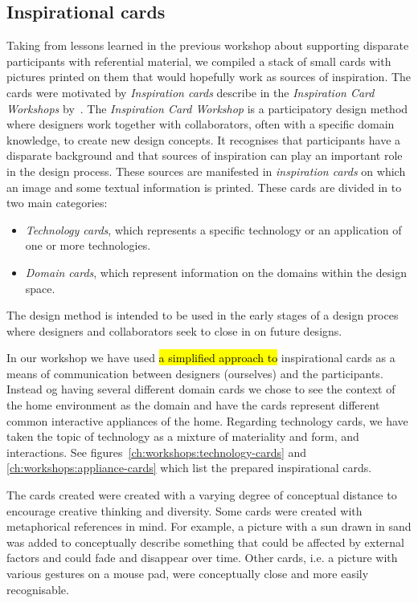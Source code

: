 \subsection{Inspirational cards}

Taking from lessons learned in the previous workshop about supporting disparate participants with referential material, we compiled a stack of small cards with pictures printed on them that would hopefully work as sources of inspiration.
The cards were motivated by \emph{Inspiration cards} describe in the \emph{Inspiration Card Workshops} by~\cite{halskov2006inspiration}.
The \emph{Inspiration Card Workshop} is a participatory design method where designers work together with collaborators, often with a specific domain knowledge, to create new design concepts.
It recognises that participants have a disparate background and that sources of inspiration can play an important role in the design process.
These sources are manifested in \emph{inspiration cards} on which an image and some textual information is printed.
These cards are divided in to two main categories:
\begin{itemize}
  \item{\emph{Technology cards}, which represents a specific technology or an application of one or more technologies.}
  \item{\emph{Domain cards}, which represent information on the domains within the design space.}
\end{itemize}
The design method is intended to be used in the early stages of a design proces where designers and collaborators seek to close in on future designs.

In our workshop we have used \hl{a simplified approach to} inspirational cards as a means of communication between designers (ourselves) and the participants.
Instead og having several different domain cards we chose to see the context of the home environment as the domain and have the cards represent different common interactive appliances of the home.
Regarding technology cards, we have taken the topic of technology as a mixture of materiality and form, and interactions.
See figures~\ref{ch:workshops:technology-cards} and \ref{ch:workshops:appliance-cards} which list the prepared inspirational cards.

The cards created were created with a varying degree of conceptual distance to encourage creative thinking and diversity.
Some cards were created with metaphorical references in mind.
For example, a picture with a sun drawn in sand was added to conceptually describe something that could be affected by external factors and could fade and disappear over time.
Other cards, i.e. a picture with various gestures on a mouse pad, were conceptually close and more easily recognisable.

